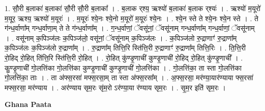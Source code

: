 \documentclass[17pt]{extarticle}
\begin{document}
1. सौ॒री ब॒लाका॑ ब॒लाका॑ सौ॒री सौ॒री ब॒लाका᳚ । . ब॒लाक र्‌श्य॒ ऋश्यो॑ ब॒लाका॑ ब॒लाक र्‌श्यः॑ । . ऋश्यो॑ म॒यूरो॑ म॒यूर॒ ऋश्य॒ ऋश्यो॑ म॒यूरः॑ । . म॒यूरः॑ श्ये॒नः श्ये॒नो म॒यूरो॑ म॒यूरः॑ श्ये॒नः । . श्ये॒न स्ते ते श्ये॒नः श्ये॒न स्ते । . ते ग॑न्ध॒र्वाणा᳚म् गन्ध॒र्वाणा॒म् ते ते ग॑न्ध॒र्वाणा᳚म् । . ग॒न्ध॒र्वाणां॒ ॅवसू॑नां॒ ॅवसू॑नाम् गन्ध॒र्वाणा᳚म् गन्ध॒र्वाणां॒ ॅवसू॑नाम् । . वसू॑नाम् क॒पिञ्ज॑लः क॒पिञ्ज॑लो॒ वसू॑नां॒ ॅवसू॑नाम् क॒पिञ्ज॑लः । . क॒पिञ्ज॑लो रु॒द्राणाꣳ॑ रु॒द्राणा᳚म् क॒पिञ्ज॑लः क॒पिञ्ज॑लो रु॒द्राणा᳚म् । . रु॒द्राणा᳚म् तित्ति॒रि स्ति॑त्ति॒री रु॒द्राणाꣳ॑ रु॒द्राणा᳚म् तित्ति॒रिः । . ति॒त्ति॒री रो॒हिद् रो॒हित् ति॑त्ति॒रि स्ति॑त्ति॒री रो॒हित् । . रो॒हित् कु॑ण्डृ॒णाची॑ कुण्डृ॒णाची॑ रो॒हिद् रो॒हित् कु॑ण्डृ॒णाची᳚ । . कु॒ण्डृ॒णाची॑ गो॒लत्ति॑का गो॒लत्ति॑का कुण्डृ॒णाची॑ कुण्डृ॒णाची॑ गो॒लत्ति॑का । . गो॒लत्ति॑का॒ ता स्ता गो॒लत्ति॑का गो॒लत्ति॑का॒ ताः । . ता अ॑फ्स॒रसा॑ मफ्स॒रसा॒म् ता स्ता अ॑फ्स॒रसा᳚म् । . अ॒फ्स॒रसा॒ मर॑ण्या॒यार॑ण्याया फ्स॒रसा॑ मफ्स॒रसा॒ मर॑ण्याय । . अर॑ण्याय सृम॒रः सृ॑म॒रो ऽर॑ण्या॒या र॑ण्याय सृम॒रः । . सृ॒म॒र इति॑ सृम॒रः । \newline

\textbf{Ghana Paata } \newline
\end{document}
